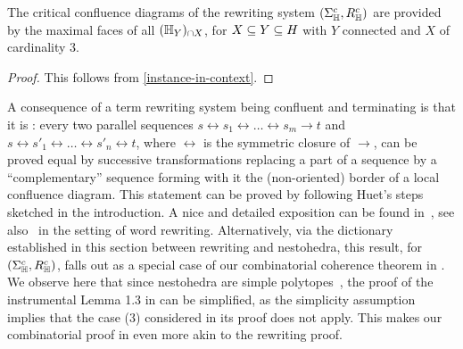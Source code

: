 \begin{proposition}
\label{critical-pairs-nestohedra}
The critical confluence diagrams of the rewriting system $(\Sigma_{\mathbb H}^c,R_{\mathbb H}^c)$  are provided by the maximal  faces of all $({\mathbb H}_Y)_{\cap X}$, for $X\subseteq Y \subseteq H$ with $Y$ connected and $X$ of cardinality 3.
\end{proposition}
\begin{proof}
This follows from \cref{instance-in-context}.
\end{proof}

\begin{remark}
  \label{rem:coherence}
A consequence of a term rewriting system  being confluent and terminating is that it is :
every two parallel  sequences
 $s\leftrightarrow s_1 \leftrightarrow \ldots \leftrightarrow s_m\to t$ and $s\leftrightarrow s'_1 \leftrightarrow \ldots \leftrightarrow s'_n\leftrightarrow t$, where $\leftrightarrow$ is the symmetric closure of $\to$,  can be proved equal by successive transformations replacing a part of a  sequence by a ``complementary''  sequence forming with it the (non-oriented) border of a local confluence diagram. 
 This statement can be proved by following Huet's steps sketched in the introduction.  
 A nice and detailed exposition can be found in~\cite{Beke-Knuth}, see also~\cite{GM-FDT} in the 
 setting of word rewriting.
 Alternatively, via the dictionary  established in this section between rewriting and nestohedra, this result, for $(\Sigma_{\mathbb H}^c ,R_{\mathbb H}^c)$, falls out as a special case of our combinatorial coherence theorem in \cite[Thm~1.4 \& Prop.~1.7]{CLA1}. 
 We observe here that since nestohedra are simple polytopes~\cite[Sec.~9]{DP-HP}, the proof of the instrumental Lemma 1.3 in \cite{CLA1} can be simplified, as the simplicity assumption implies that the case (3) considered in its proof does not apply. 
 This makes our combinatorial proof in \cite{CLA1} even more akin to the rewriting proof.
 \end{remark}


